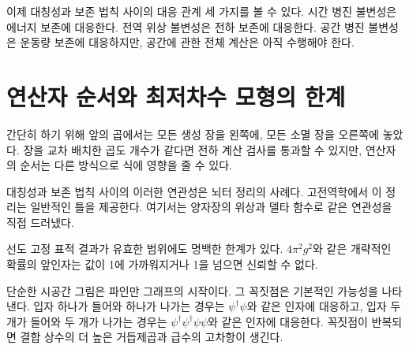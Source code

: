 이제 대칭성과 보존 법칙 사이의 대응 관계 세 가지를 볼 수 있다. 시간 병진 불변성은 에너지 보존에 대응한다. 전역 위상 불변성은 전하 보존에 대응한다. 공간 병진 불변성은 운동량 보존에 대응하지만, 공간에 관한 전체 계산은 아직 수행해야 한다.

\section{연산자 순서와 최저차수 모형의 한계}

간단히 하기 위해 앞의 곱에서는 모든 생성 장을 왼쪽에, 모든 소멸 장을 오른쪽에 놓았다. 장을 교차 배치한 곱도 개수가 같다면 전하 계산 검사를 통과할 수 있지만, 연산자의 순서는 다른 방식으로 식에 영향을 줄 수 있다.

\begin{classroomqa}
\end{classroomqa}


대칭성과 보존 법칙 사이의 이러한 연관성은 뇌터 정리의 사례다. 고전역학에서 이 정리는 일반적인 틀을 제공한다. 여기서는 양자장의 위상과 델타 함수로 같은 연관성을 직접 드러냈다.

선도 고정 표적 결과가 유효한 범위에도 명백한 한계가 있다. \(4\pi^2g^2\)와 같은 개략적인 확률의 앞인자는 값이 1에 가까워지거나 1을 넘으면 신뢰할 수 없다.

\begin{classroomqa}
\end{classroomqa}

단순한 시공간 그림은 파인만 그래프의 시작이다. 그 꼭짓점은 기본적인 가능성을 나타낸다. 입자 하나가 들어와 하나가 나가는 경우는 \(\psi^\dagger\psi\)와 같은 인자에 대응하고, 입자 두 개가 들어와 두 개가 나가는 경우는 \(\psi^\dagger\psi^\dagger\psi\psi\)와 같은 인자에 대응한다. 꼭짓점이 반복되면 결합 상수의 더 높은 거듭제곱과 급수의 고차항이 생긴다.

